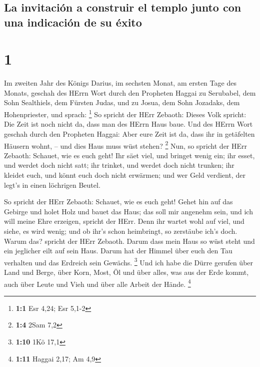 \hypertarget{la-invitaciuxf3n-a-construir-el-templo-junto-con-una-indicaciuxf3n-de-su-uxe9xito}{%
\subsection{La invitación a construir el templo junto con una indicación
de su
éxito}\label{la-invitaciuxf3n-a-construir-el-templo-junto-con-una-indicaciuxf3n-de-su-uxe9xito}}

\hypertarget{section}{%
\section{1}\label{section}}

 Im zweiten Jahr des Königs Darius, im sechsten Monat, am
ersten Tage des Monats, geschah des HErrn Wort durch den Propheten
Haggai zu Serubabel, dem Sohn Sealthiels, dem Fürsten Judas, und zu
Josua, dem Sohn Jozadaks, dem Hohenpriester, und sprach: \footnote{\textbf{1:1}
  Esr 4,24; Esr 5,1-2}  So spricht der HErr Zebaoth:
Dieses Volk spricht: Die Zeit ist noch nicht da, dass man des HErrn Haus
baue.  Und des HErrn Wort geschah durch den Propheten
Haggai:  Aber eure Zeit ist da, dass ihr in getäfelten
Häusern wohnt, -- und dies Haus muss wüst stehen? \footnote{\textbf{1:4}
  2Sam 7,2}  Nun, so spricht der HErr Zebaoth: Schauet,
wie es euch geht!  Ihr säet viel, und bringet wenig ein;
ihr esset, und werdet doch nicht satt; ihr trinket, und werdet doch
nicht trunken; ihr kleidet euch, und könnt euch doch nicht erwärmen; und
wer Geld verdient, der legt's in einen löchrigen Beutel.

 So spricht der HErr Zebaoth: Schauet, wie es euch geht!
 Gehet hin auf das Gebirge und holet Holz und bauet das
Haus; das soll mir angenehm sein, und ich will meine Ehre erzeigen,
spricht der HErr.  Denn ihr wartet wohl auf viel, und
siehe, es wird wenig; und ob ihr's schon heimbringt, so zerstäube ich's
doch. Warum das? spricht der HErr Zebaoth. Darum dass mein Haus so wüst
steht und ein jeglicher eilt auf sein Haus.  Darum hat
der Himmel über euch den Tau verhalten und das Erdreich sein Gewächs.
\footnote{\textbf{1:10} 1Kö 17,1}  Und ich habe die Dürre
gerufen über Land und Berge, über Korn, Most, Öl und über alles, was aus
der Erde kommt, auch über Leute und Vieh und über alle Arbeit der Hände.
\footnote{\textbf{1:11} Haggai 2,17; Am 4,9}

